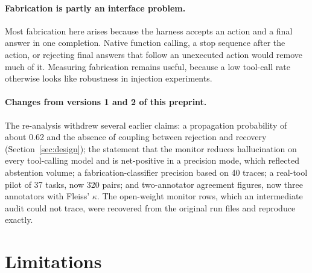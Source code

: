 \documentclass[pdflatex,sn-mathphys-num,Numbered]{sn-jnl}
\begin{document}
\paragraph{Fabrication is partly an interface problem.} Most fabrication here arises because the harness accepts an action and a final answer in one completion. Native function calling, a stop sequence after the action, or rejecting final answers that follow an unexecuted action would remove much of it. Measuring fabrication remains useful, because a low tool-call rate otherwise looks like robustness in injection experiments.

\paragraph{Changes from versions 1 and 2 of this preprint.}\label{sec:changes}
The re-analysis withdrew several earlier claims: a propagation probability of about 0.62 and the absence of coupling between rejection and recovery (Section~\ref{sec:design}); the statement that the monitor reduces hallucination on every tool-calling model and is net-positive in a precision mode, which reflected abstention volume; a fabrication-classifier precision based on 40 traces; a real-tool pilot of 37 tasks, now 320 pairs; and two-annotator agreement figures, now three annotators with Fleiss' $\kappa$. The open-weight monitor rows, which an intermediate audit could not trace, were recovered from the original run files and reproduce exactly.

\section{Limitations}\label{sec:limitations}
\end{document}
